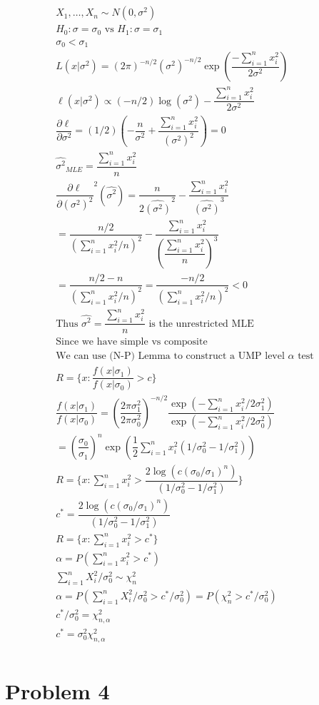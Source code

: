 \documentclass{article}
\newcommand{\sg}{\sigma}
\newcommand{\sumn}{\sum_{i=1}^{n}}
\newcommand{\dll}[1]{\dfrac{\partial\ell}{\partial{#1}}}
\newcommand{\sumx}{\sum_{i=1}^{n}x_i}
\newcommand{\samp}{X_1,\dots,X_n \sim}
\newcommand{\sn}{(\sg^2)}
\begin{document}
\begin{flushleft}
\begin{multline*}\\
\samp N(0,\sg^2)\\
H_0:\sg=\sg_0 \text{ vs } H_1:\sg=\sg_1\\
\sg_0<\sg_1\\
L(x|\sg^2)=(2\pi)^{-n/2}(\sg^2)^{-n/2}\exp \left(\dfrac{-\sumx^2}{2\sg^2}\right)\\
\ell(x|\sg^2)\propto (-n/2)\log(\sg^2)-\dfrac{\sumx^2}{2\sg^2}\\
\dll{\sg^2}=(1/2)\left(-\dfrac{n}{\sg^2}+\dfrac{\sumx^2}{\sn^2}\right)=0\\
\hat{\sg^2}_{MLE}=\dfrac{\sumx^2}{n}\\
\dll{\sn^2}^2(\hat{\sg^2})=\dfrac{n}{2\hat{\sn}^2}-\dfrac{\sumx^2}{\hat{\sn}^3}\\
=\dfrac{n/2}{(\sumx^2/n)^2}-\dfrac{\sumx^2}{(\dfrac{\sumx^2}{n})^3}\\
=\dfrac{n/2-n}{(\sumx^2/n)^2}=\dfrac{-n/2}{(\sumx^2/n)^2}<0\\
\text{Thus } \hat{\sg^2}=\dfrac{\sumx^2}{n} \text{ is the unrestricted MLE}\\
\text{Since we have simple vs composite}\\
\text{We can use (N-P) Lemma to construct a UMP level } \alpha \text{ test}\\
R=\{x:\dfrac{f(x|\sg_1)}{f(x|\sg_0)}>c\}\\
\dfrac{f(x|\sg_1)}{f(x|\sg_0)}=\left(\dfrac{2\pi\sg_1^2}{2\pi\sg_0^2}\right)^{-n/2}\dfrac{\exp\left(-\sumn x_i^2/2\sg_1^2\right)}{\exp\left(-\sumn x_i^2 /2\sg_0^2 \right)}\\
=\left(\dfrac{\sg_0}{\sg_1}\right)^n\exp\left(\dfrac{1}{2}\sumn x_i^2(1/\sg_0^2-1/\sg_1^2)\right)\\
R=\{x:\sumn x_i^2>\dfrac{2\log(c(\sg_0/\sg_1)^n)}{(1/\sg_0^2-1/\sg_1^2)} \}\\
c^*=\dfrac{2\log(c(\sg_0/\sg_1)^n)}{(1/\sg_0^2-1/\sg_1^2)}\\
R=\{x:\sumn x_i^2>c^*\}\\
\alpha=P(\sumn x_i^2>c^*)\\
\sumn X_i^2/\sg_0^2\sim \chi_n^2\\
\alpha=P(\sumn X_i^2/\sg_0^2>c^*/\sg_0^2)=P(\chi_n^2>c^*/\sg_0^2)\\
c^*/\sg_0^2=\chi_{n,\alpha}^2\\
c^*=\sg_0^2\chi_{n,\alpha}^2\\
\end{multline*}   

\section*{Problem 4}
	

\end{flushleft}
\end{document}
